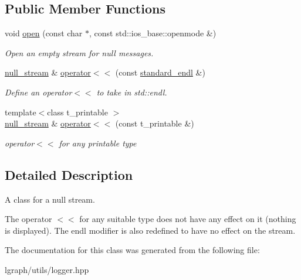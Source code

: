 \subsection*{Public Member Functions}
\begin{DoxyCompactItemize}
\item 
void \hyperlink{classlgraph_1_1utils_1_1null__stream_a4b1d2687e779efef7d4995bcede83448}{open} (const char $\ast$, const std\+::ios\+\_\+base\+::openmode \&)\hypertarget{classlgraph_1_1utils_1_1null__stream_a4b1d2687e779efef7d4995bcede83448}{}\label{classlgraph_1_1utils_1_1null__stream_a4b1d2687e779efef7d4995bcede83448}

\begin{DoxyCompactList}\small\item\em Open an empty stream for null messages. \end{DoxyCompactList}\item 
\hyperlink{classlgraph_1_1utils_1_1null__stream}{null\+\_\+stream} \& \hyperlink{classlgraph_1_1utils_1_1null__stream_a6dd6b8cde39e03fe63eb2feef89ebc11}{operator$<$$<$} (const \hyperlink{classlgraph_1_1utils_1_1null__stream_ada7be393792a0f7b90452c981a279d08}{standard\+\_\+endl} \&)\hypertarget{classlgraph_1_1utils_1_1null__stream_a6dd6b8cde39e03fe63eb2feef89ebc11}{}\label{classlgraph_1_1utils_1_1null__stream_a6dd6b8cde39e03fe63eb2feef89ebc11}

\begin{DoxyCompactList}\small\item\em Define an operator$<$$<$ to take in std\+::endl. \end{DoxyCompactList}\item 
{\footnotesize template$<$class t\+\_\+printable $>$ }\\\hyperlink{classlgraph_1_1utils_1_1null__stream}{null\+\_\+stream} \& \hyperlink{classlgraph_1_1utils_1_1null__stream_a633f62bff5dd6e4973674d2f109732cf}{operator$<$$<$} (const t\+\_\+printable \&)\hypertarget{classlgraph_1_1utils_1_1null__stream_a633f62bff5dd6e4973674d2f109732cf}{}\label{classlgraph_1_1utils_1_1null__stream_a633f62bff5dd6e4973674d2f109732cf}

\begin{DoxyCompactList}\small\item\em operator$<$$<$ for any printable type \end{DoxyCompactList}\end{DoxyCompactItemize}


\subsection{Detailed Description}
A class for a null stream. 

The operator \textquotesingle{}$<$$<$\textquotesingle{} for any suitable type does not have any effect on it (nothing is displayed). The \textquotesingle{}endl\textquotesingle{} modifier is also redefined to have no effect on the stream. 

The documentation for this class was generated from the following file\+:\begin{DoxyCompactItemize}
\item 
lgraph/utils/logger.\+hpp\end{DoxyCompactItemize}
